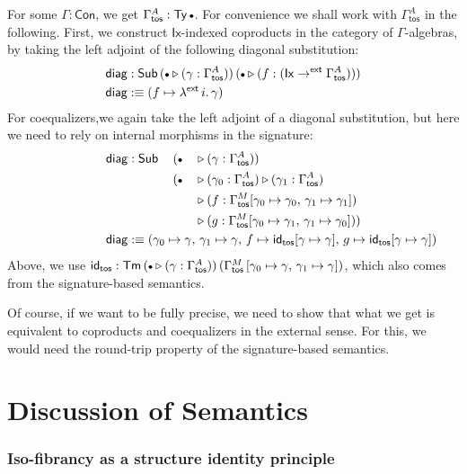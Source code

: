 \documentclass[12pt,a4paper,twoside,openany]{book}
\theoremstyle{remark}
\theoremstyle{definition}
\theoremstyle{theorem}
\newcommand{\ms}[1]{\mathsf{#1}}
\newcommand{\id}{\mathsf{id}}
\newcommand{\Con}{\mathsf{Con}}
\newcommand{\Sub}{\mathsf{Sub}}
\newcommand{\Tm}{\mathsf{Tm}}
\newcommand{\Ty}{\mathsf{Ty}}
\newcommand{\ext}{\triangleright}
\newcommand{\emptycon}{\scaleobj{.75}\bullet}
\newcommand{\toe}{\to^{\ms{ext}}}
\newcommand{\defn}{:\equiv}
\begin{document}
For some $\Gamma : \Con$, we get $\Gamma^A_{\ms{tos}} : \Ty\,\emptycon$. For
convenience we shall work with $\Gamma^A_{\ms{tos}}$ in the following. First, we
construct $\ms{Ix}$-indexed coproducts in the category of $\Gamma$-algebras, by
taking the left adjoint of the following diagonal substitution:
\begin{alignat*}{3}
  &\ms{diag} : \Sub\,(\emptycon\ext(\gamma : \Gamma^A_{\ms{tos}}))\,(\emptycon\ext (f : (\ms{Ix} \toe \Gamma^A_{\ms{tos}})))\\
  &\ms{diag} \defn (f \mapsto \lambda^{\ms{ext}}\,i.\,\gamma)
\end{alignat*}
For coequalizers,we again take the left adjoint of a diagonal substitution, but
here we need to rely on internal morphisms in the signature:
\begin{alignat*}{3}
  &\ms{diag} : \Sub\,&&(\emptycon&&\ext(\gamma : \Gamma^A_{\ms{tos}}))\\
  &&&(\emptycon&&\ext (\gamma_0 : \Gamma^A_{\ms{tos}}) \ext (\gamma_1 : \Gamma^A_{\ms{tos}})\\
  &&&&&\ext (f : \Gamma^M_{\ms{tos}}[\gamma_0 \mapsto \gamma_0,\,\gamma_1 \mapsto \gamma_1])\\
  &&&&&\ext (g : \Gamma^M_{\ms{tos}}[\gamma_0 \mapsto \gamma_1,\,\gamma_1 \mapsto \gamma_0]))\\
  &\rlap{$\ms{diag} \defn (\gamma_0 \mapsto \gamma,\,\gamma_1 \mapsto \gamma,\,f \mapsto \id_{\ms{tos}}[\gamma \mapsto \gamma],\,
           g \mapsto \id_{\ms{tos}}[\gamma \mapsto \gamma]) $}
\end{alignat*}
Above, we use $\id_{\ms{tos}} : \Tm\,(\emptycon\ext(\gamma :
\Gamma^A_{\ms{tos}}))\,(\Gamma^M_{\ms{tos}}\,[\gamma_0 \mapsto \gamma,\,\gamma_1
  \mapsto \gamma])$, which also comes from the signature-based semantics.

Of course, if we want to be fully precise, we need to show that what we get is
equivalent to coproducts and coequalizers in the external sense. For this, we
would need the round-trip property of the signature-based semantics.

\section{Discussion of Semantics}

\subsubsection{Iso-fibrancy as a structure identity principle}
\end{document}
